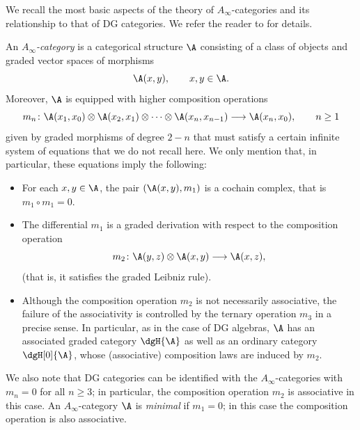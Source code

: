 \documentclass[a4paper]{amsart}
\begin{document}
We recall the most basic aspects of the theory of $A_\infty$-ca\-te\-go\-ries
and its relationship to that of DG categories. We refer the reader to
\cite{Kel01,Lef03} for details.

An \emph{$A_\infty$-category} is a categorical structure $\A$ consisting of a
class of objects and graded vector spaces of morphisms
\[
  \A(x,y),\qquad x,y\in\A.
\]
Moreover, $\A$ is equipped with higher composition operations
\[
  m_n\colon\A(x_1,x_0)\otimes\A(x_2,x_1)\otimes\cdots\otimes\A(x_n,x_{n-1})\longrightarrow\A(x_n,x_0),\qquad
  n\geq1
\]
given by graded morphisms of degree $2-n$ that must satisfy a certain infinite
system of equations that we do not recall here. We only mention that, in
particular, these equations imply the following:
\begin{itemize}
\item For each $x,y\in\A$, the pair $(\A(x,y),m_1)$ is a cochain complex, that
  is $m_1\circ m_1=0$.
\item The differential $m_1$ is a graded derivation with respect to the
  composition operation
  \[
    m_2\colon\A(y,z)\otimes\A(x,y)\longrightarrow\A(x,z),
  \]
  (that is, it satisfies the graded Leibniz rule).
\item Although the composition operation $m_2$ is not necessarily associative,
  the failure of the associativity is controlled by the ternary operation $m_3$
  in a precise sense. In particular, as in the case of DG algebras, $\A$ has an
  associated graded category $\dgH{\A}$ as well as an ordinary category
  $\dgH[0]{\A}$, whose (associative) composition laws are induced by $m_2$.
\end{itemize}
We also note that DG categories can be identified with the $A_\infty$-categories
with $m_n=0$ for all $n\geq3$; in particular, the composition operation $m_2$ is
associative in this case. An $A_\infty$-category $\A$ is \emph{minimal} if
$m_1=0$; in this case the composition operation is also associative.
\end{document}
